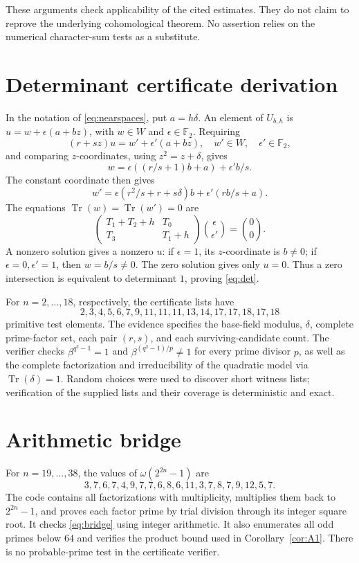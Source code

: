\documentclass[11pt,a4paper]{article}
\theoremstyle{definition}\newtheorem{definition}[theorem]{Definition}
\theoremstyle{remark}\newtheorem{remark}[theorem]{Remark}
\newcommand{\F}{\mathbb F}
\newcommand{\Tr}{\operatorname{Tr}}
\numberwithin{equation}{section}
\begin{document}
These arguments check applicability of the cited estimates. They do not claim to reprove the underlying cohomological theorem. No assertion relies on the numerical character-sum tests as a substitute.

\section{Determinant certificate derivation}\label{app:det}
In the notation of \eqref{eq:nearspaces}, put $a=h\delta$. An element of $U_{b,h}$ is $u=w+\epsilon(a+bz)$, with $w\in W$ and $\epsilon\in\F_2$. Requiring
\[
(r+sz)u=w'+\epsilon'(a+bz),\quad w'\in W,\quad\epsilon'\in\F_2,
\]
and comparing $z$-coordinates, using $z^2=z+\delta$, gives
\[
w=\epsilon((r/s+1)b+a)+\epsilon'b/s.
\]
The constant coordinate then gives
\[
w'=\epsilon(r^2/s+r+s\delta)b+\epsilon'(rb/s+a).
\]
The equations $\Tr(w)=\Tr(w')=0$ are
\[
\begin{pmatrix}T_1+T_2+h&T_0\\T_3&T_1+h\end{pmatrix}
\binom{\epsilon}{\epsilon'}=\binom00.
\]
A nonzero solution gives a nonzero $u$: if $\epsilon=1$, its $z$-coordinate is $b\ne0$; if $\epsilon=0,\epsilon'=1$, then $w=b/s\ne0$. The zero solution gives only $u=0$. Thus a zero intersection is equivalent to determinant $1$, proving \eqref{eq:det}.

For $n=2,\ldots,18$, respectively, the certificate lists have
\[
2,3,4,5,6,7,9,11,11,11,13,14,17,17,18,17,18
\]
primitive test elements. The evidence specifies the base-field modulus, $\delta$, complete prime-factor set, each pair $(r,s)$, and each surviving-candidate count. The verifier checks $\beta^{q^2-1}=1$ and $\beta^{(q^2-1)/p}\ne1$ for every prime divisor $p$, as well as the complete factorization and irreducibility of the quadratic model via $\Tr(\delta)=1$. Random choices were used to discover short witness lists; verification of the supplied lists and their coverage is deterministic and exact.

\section{Arithmetic bridge}\label{app:arithmetic}
For $n=19,\ldots,38$, the values of $\omega(2^{2n}-1)$ are
\[
3,7,6,7,4,9,7,7,6,8,6,11,3,7,8,7,9,12,5,7.
\]
The code contains all factorizations with multiplicity, multiplies them back to $2^{2n}-1$, and proves each factor prime by trial division through its integer square root. It checks \eqref{eq:bridge} using integer arithmetic. It also enumerates all odd primes below $64$ and verifies the product bound used in Corollary~\ref{cor:A1}. There is no probable-prime test in the certificate verifier.
\end{document}
